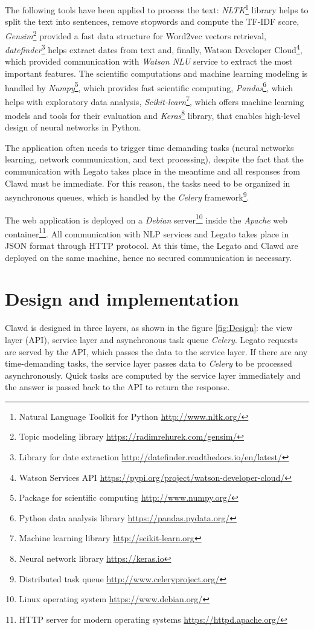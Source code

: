 \documentclass[
  digital, %
  notable,   %
  nolof,     %
  nolot,     %
]{fithesis3}
\begin{document}
The following tools have been applied to process the text:
\textit{NLTK}\footnote{Natural Language Toolkit for Python \url{http://www.nltk.org/}} library helps to split the text into sentences, remove stopwords and compute the TF-IDF score, 
\textit{Gensim}\footnote{Topic modeling library \url{https://radimrehurek.com/gensim/}} provided a fast data structure for Word2vec vectors retrieval, \textit{datefinder}\footnote{Library for date extraction \url{http://datefinder.readthedocs.io/en/latest/}}
helps extract dates from text and, finally,
Watson Developer Cloud\footnote{Watson Services API \url{https://pypi.org/project/watson-developer-cloud/}}, which provided communication with \textit{Watson NLU} service to extract the most important features.
The scientific computations and machine learning modeling is handled by \textit{Numpy}\footnote{Package for scientific computing \url{http://www.numpy.org/}}, which provides fast scientific computing,
\textit{Pandas}\footnote{Python data analysis library \url{https://pandas.pydata.org/}}, which helps with exploratory data analysis,
\textit{Scikit-learn}\footnote{Machine learning library \url{http://scikit-learn.org}}, which offers machine learning models and tools for their evaluation and
\textit{Keras}\footnote{Neural network library \url{https://keras.io}} library, that enables high-level design of neural networks in Python.

The application often needs to trigger time demanding tasks (neural networks learning, network communication, and text processing), despite the fact that the communication with Legato takes place in the meantime and all responses from Clawd must be immediate.
For this reason, the tasks need to be organized in asynchronous queues, which is handled by the \textit{Celery} framework\footnote{Distributed task queue \url{http://www.celeryproject.org/}}.

The web application is deployed on a \textit{Debian} server\footnote{Linux operating system \url{https://www.debian.org/}} inside the \textit{Apache} web container\footnote{HTTP server for modern operating systems \url{https://httpd.apache.org/}}.
All communication with NLP services and Legato takes place in JSON format through HTTP protocol.
At this time, the Legato and Clawd are deployed on the same machine, hence no secured communication is necessary.

\section{Design and implementation}
Clawd is designed in three layers, as shown in the figure \ref{fig:Design}: the view layer (API), service layer and asynchronous task queue \textit{Celery}.
Legato requests are served by the API, which passes the data to the service layer.
If there are any time-demanding tasks, the service layer passes data to \textit{Celery} to be processed asynchronously.
Quick tasks are computed by the service layer immediately and the answer is passed back to the API to return the response.
\end{document}

